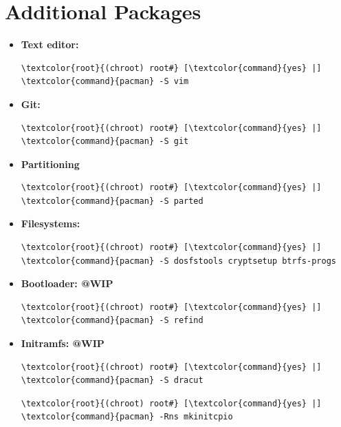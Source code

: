 \documentclass[10pt, a4paper, onecolumn, oneside, titlepage, openany]{book}
\begin{document}
\section{Additional Packages}
\begin{itemize}
    \item \textbf{Text editor:}
\begin{Verbatim}[commandchars=\\\{\}]
\textcolor{root}{(chroot) root#} [\textcolor{command}{yes} |] \textcolor{command}{pacman} -S vim
\end{Verbatim}
    \item \textbf{Git:}
\begin{Verbatim}[commandchars=\\\{\}]
\textcolor{root}{(chroot) root#} [\textcolor{command}{yes} |] \textcolor{command}{pacman} -S git
\end{Verbatim}
    \item \textbf{Partitioning}
\begin{Verbatim}[commandchars=\\\{\}]
\textcolor{root}{(chroot) root#} [\textcolor{command}{yes} |] \textcolor{command}{pacman} -S parted
\end{Verbatim}
    \item \textbf{Filesystems:}
\begin{Verbatim}[commandchars=\\\{\}]
\textcolor{root}{(chroot) root#} [\textcolor{command}{yes} |] \textcolor{command}{pacman} -S dosfstools cryptsetup btrfs-progs
\end{Verbatim}
    \item \textbf{Bootloader: @WIP}
\begin{Verbatim}[commandchars=\\\{\}]
\textcolor{root}{(chroot) root#} [\textcolor{command}{yes} |] \textcolor{command}{pacman} -S refind
\end{Verbatim}
     \item \textbf{Initramfs: @WIP}
\begin{Verbatim}[commandchars=\\\{\}]
\textcolor{root}{(chroot) root#} [\textcolor{command}{yes} |] \textcolor{command}{pacman} -S dracut
\end{Verbatim}
\begin{Verbatim}[commandchars=\\\{\}]
\textcolor{root}{(chroot) root#} [\textcolor{command}{yes} |] \textcolor{command}{pacman} -Rns mkinitcpio
\end{Verbatim}

\end{itemize}
\end{document}
